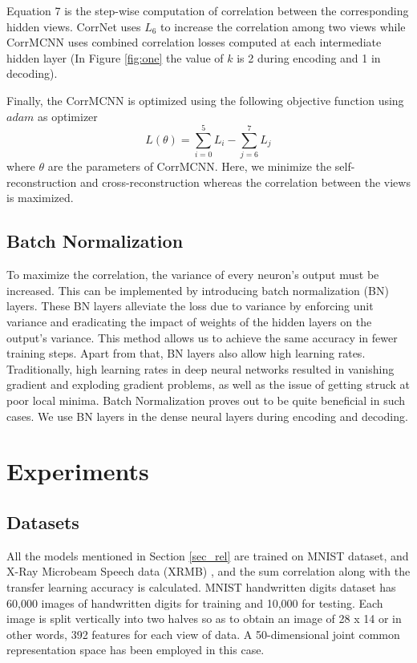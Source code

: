 \documentclass[10pt, a4paper, conference, compsocconf]{IEEEtran}
\begin{document}
Equation 7 is the step-wise computation of correlation between the corresponding hidden views. 
CorrNet uses $L_6$ to increase the correlation among two views while CorrMCNN uses combined correlation losses computed at each intermediate hidden layer (In Figure \ref{fig:one} the value of $k$ is 2 during encoding and 1 in decoding).

Finally, the CorrMCNN is optimized using the following objective function using $adam$ as optimizer 
\begin{dmath}
L(\theta) = \sum_{i=0}^{5} {L}_{i} - \sum_{j=6}^{7} {L}_{j}
\end{dmath}
where $\theta$ are the parameters of CorrMCNN. Here, we minimize the self-reconstruction and cross-reconstruction whereas the correlation between the views is maximized.

\subsection{Batch Normalization}
To maximize the correlation, the variance of every neuron's output must be increased. This can be implemented by introducing batch normalization (BN) \cite{ioffe2015batch} layers. These BN layers alleviate the loss due to variance by enforcing unit variance and eradicating the impact of weights of the hidden layers on the output's variance. This method allows us to achieve the same accuracy in fewer training steps. Apart from that, BN layers also allow high learning rates. Traditionally, high learning rates in deep neural networks resulted in vanishing gradient and exploding gradient problems, as well as the issue of getting struck at poor local minima. Batch Normalization proves out to be quite beneficial in such cases. We use BN layers in the dense neural layers during encoding and decoding.

\section{Experiments}
\label{sec_exp}

\subsection{Datasets}
All the models mentioned in Section \ref{sec_rel} are trained on MNIST dataset, and X-Ray Microbeam Speech data (XRMB) \cite{westbury1990xrmb}, and the sum correlation along with the transfer learning accuracy is calculated. MNIST handwritten digits dataset has 60,000 images of handwritten digits for training and 10,000 for testing. Each image is split vertically into two halves so as to obtain an image of 28 x 14 or in other words, 392 features for each view of data. A 50-dimensional joint common representation space has been employed in this case. 
\end{document}
